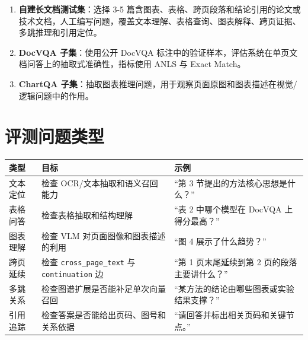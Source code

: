\begin{enumerate}
\def\labelenumi{\arabic{enumi}.}
\tightlist
\item
  \textbf{自建长文档测试集}：选择 3-5
  篇含图表、表格、跨页段落和结论引用的论文或技术文档，人工编写问题，覆盖文本理解、表格查询、图表解释、跨页证据、多跳推理和引用定位。
\item
  \textbf{DocVQA 子集}：使用公开 DocVQA
  标注中的验证样本，评估系统在单页文档问答上的抽取式准确性，指标使用
  ANLS 与 Exact Match。
\item
  \textbf{ChartQA
  子集}：抽取图表推理问题，用于观察页面原图和图表描述在视觉/逻辑问题中的作用。
\end{enumerate}

\section{评测问题类型}\label{ux8bc4ux6d4bux95eeux9898ux7c7bux578b}

\begin{longtable}[]{@{}
  >{\raggedright\arraybackslash}p{}
  >{\raggedright\arraybackslash}p{}
  >{\raggedright\arraybackslash}p{}@{}}
\toprule\noalign{}
\begin{minipage}[b]{\linewidth}\raggedright
类型
\end{minipage} & \begin{minipage}[b]{\linewidth}\raggedright
目标
\end{minipage} & \begin{minipage}[b]{\linewidth}\raggedright
示例
\end{minipage} \\
\midrule\noalign{}
\endhead
\bottomrule\noalign{}
\endlastfoot
文本定位 & 检查 OCR/文本抽取和语义召回能力 & ``第 3
节提出的方法核心思想是什么？'' \\
表格问答 & 检查表格抽取和结构理解 & ``表 2 中哪个模型在 DocVQA
上得分最高？'' \\
图表理解 & 检查 VLM 对页面图像和图表描述的利用 & ``图 4
展示了什么趋势？'' \\
跨页延续 & 检查 \texttt{cross\_page\_text} 与 \texttt{continuation} 边 &
``第 1 页末尾延续到第 2 页的段落主要讲什么？'' \\
多跳关系 & 检查图谱扩展是否能补足单次向量召回 &
``某方法的结论由哪些图表或实验结果支撑？'' \\
引用追踪 & 检查答案是否能给出页码、图号和关系依据 &
``请回答并标出相关页码和关键节点。'' \\
\end{longtable}

